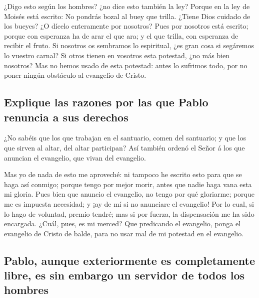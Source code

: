  ¿Digo esto según los hombres? ¿no dice esto también la ley?
 Porque en la ley de Moisés está escrito: No pondrás bozal
al buey que trilla. ¿Tiene Dios cuidado de los bueyes?  ¿O
dícelo enteramente por nosotros? Pues por nosotros está escrito; porque
con esperanza ha de arar el que ara; y el que trilla, con esperanza de
recibir el fruto.  Si nosotros os sembramos lo espiritual,
¿es gran cosa si segáremos lo vuestro carnal?  Si otros
tienen en vosotros esta potestad, ¿no más bien nosotros? Mas no hemos
usado de esta potestad: antes lo sufrimos todo, por no poner ningún
obstáculo al evangelio de Cristo.

\hypertarget{explique-las-razones-por-las-que-pablo-renuncia-a-sus-derechos}{%
\subsection{Explique las razones por las que Pablo renuncia a sus
derechos}\label{explique-las-razones-por-las-que-pablo-renuncia-a-sus-derechos}}

 ¿No sabéis que los que trabajan en el santuario, comen del
santuario; y que los que sirven al altar, del altar participan?
 Así también ordenó el Señor á los que anuncian el
evangelio, que vivan del evangelio.

 Mas yo de nada de esto me aproveché: ni tampoco he escrito
esto para que se haga así conmigo; porque tengo por mejor morir, antes
que nadie haga vana esta mi gloria.  Pues bien que anuncio
el evangelio, no tengo por qué gloriarme; porque me es impuesta
necesidad; y ¡ay de mí si no anunciare el evangelio!  Por
lo cual, si lo hago de voluntad, premio tendré; mas si por fuerza, la
dispensación me ha sido encargada.  ¿Cuál, pues, es mi
merced? Que predicando el evangelio, ponga el evangelio de Cristo de
balde, para no usar mal de mi potestad en el evangelio.

\hypertarget{pablo-aunque-exteriormente-es-completamente-libre-es-sin-embargo-un-servidor-de-todos-los-hombres}{%
\subsection{Pablo, aunque exteriormente es completamente libre, es sin
embargo un servidor de todos los
hombres}\label{pablo-aunque-exteriormente-es-completamente-libre-es-sin-embargo-un-servidor-de-todos-los-hombres}}

